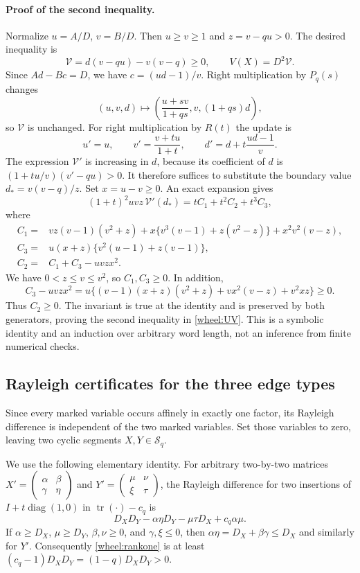 \documentclass[11pt,a4paper]{article}
\theoremstyle{definition}
\theoremstyle{remark}\newtheorem{remark}[theorem]{Remark}
\begin{document}
\paragraph{Proof of the second inequality.}
Normalize $u=A/D$, $v=B/D$. Then $u\ge v\ge1$ and $z=v-qu>0$. The desired inequality is
\[
 \mathcal V=d(v-qu)-v(v-q)\ge0,
 \qquad V(X)=D^2\mathcal V.
\]
Since $Ad-Bc=D$, we have $c=(ud-1)/v$. Right multiplication by $P_q(s)$ changes
\[
 (u,v,d)\mapsto\left(\frac{u+sv}{1+qs},v,(1+qs)d\right),
\]
so $\mathcal V$ is unchanged. For right multiplication by $R(t)$ the update is
\[
 u'=u,\qquad v'=\frac{v+tu}{1+t},\qquad d'=d+t\frac{ud-1}{v}.
\]
The expression $\mathcal V'$ is increasing in $d$, because its coefficient of $d$ is
$(1+tu/v)(v'-qu)>0$. It therefore suffices to substitute the boundary value
$d_*=v(v-q)/z$. Set $x=u-v\ge0$. An exact expansion gives
\begin{equation}\label{wheel:boundary}
 (1+t)^2uvz\,\mathcal V'(d_*)=tC_1+t^2C_2+t^3C_3,
\end{equation}
where
\begin{align*}
 C_1={}&vz(v-1)(v^2+z)
       +x\{v^3(v-1)+z(v^2-z)\}+x^2v^2(v-z),\\
 C_3={}&u(x+z)\{v^2(u-1)+z(v-1)\},\\
 C_2={}&C_1+C_3-uvzx^2.
\end{align*}
We have $0<z\le v\le v^2$, so $C_1,C_3\ge0$. In addition,
\[
 C_3-uvzx^2
 =u\{(v-1)(x+z)(v^2+z)+vx^2(v-z)+v^2xz\}\ge0.
\]
Thus $C_2\ge0$. The invariant is true at the identity and is preserved by both generators, proving the second inequality in \eqref{wheel:UV}. This is a symbolic identity and an induction over arbitrary word length, not an inference from finite numerical checks.

\subsection{Rayleigh certificates for the three edge types}
Since every marked variable occurs affinely in exactly one factor, its Rayleigh difference is independent of the two marked variables. Set those variables to zero, leaving two cyclic segments $X,Y\in\mathcal S_q$.

We use the following elementary identity. For arbitrary two-by-two matrices
$X'=\left(\begin{smallmatrix}\alpha&\beta\\\gamma&\eta\end{smallmatrix}\right)$ and
$Y'=\left(\begin{smallmatrix}\mu&\nu\\\xi&\tau\end{smallmatrix}\right)$, the Rayleigh difference for two insertions of $I+t\operatorname{diag}(1,0)$ in $\operatorname{tr}(\cdot)-c_q$ is
\begin{equation}\label{wheel:rankone}
 D_XD_Y-\alpha\eta D_Y-\mu\tau D_X+c_q\alpha\mu.
\end{equation}
If $\alpha\ge D_X$, $\mu\ge D_Y$, $\beta,\nu\ge0$, and $\gamma,\xi\le0$, then
$\alpha\eta=D_X+\beta\gamma\le D_X$ and similarly for $Y'$. Consequently \eqref{wheel:rankone} is at least
$(c_q-1)D_XD_Y=(1-q)D_XD_Y>0$.
\end{document}
